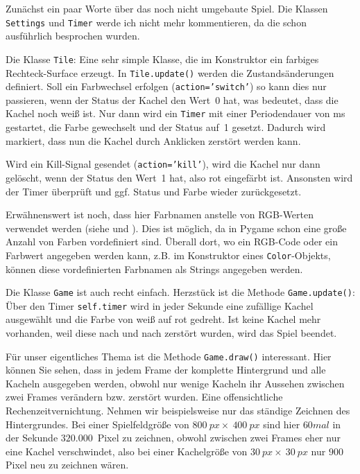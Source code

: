 Zunächst ein paar Worte über das noch nicht umgebaute Spiel. Die Klassen \texttt{Settings} und \texttt{Timer} werde ich nicht mehr kommentieren, da die schon ausführlich besprochen wurden. 

Die Klasse \texttt{Tile}: Eine sehr simple Klasse, die im Konstruktor ein farbiges Rechteck-Surface erzeugt. In \texttt{Tile.update()} werden die Zustandsänderungen definiert. Soll ein Farbwechsel erfolgen (\texttt{action='switch'}) so kann dies nur passieren, wenn der Status der Kachel den Wert~0 hat, was bedeutet, dass die Kachel noch weiß ist. Nur dann wird ein \texttt{Timer} mit einer Periodendauer von \unit[500]{ms} gestartet, die Farbe gewechselt und der Status auf~1 gesetzt. Dadurch wird markiert, dass nun die Kachel durch Anklicken zerstört werden kann.

Wird ein Kill-Signal gesendet (\texttt{action='kill'}), wird die Kachel nur dann gelöscht, wenn der Status den Wert~1 hat, also rot eingefärbt ist. Ansonsten wird der Timer überprüft und ggf. Status und Farbe wieder zurückgesetzt.

Erwähnenswert ist noch, dass hier Farbnamen anstelle von RGB-Werten verwendet werden (siehe  und ). Dies ist möglich, da in Pygame schon eine große Anzahl von Farben vordefiniert sind. Überall dort, wo ein RGB-Code oder ein Farbwert angegeben werden kann, z.B. im Konstruktor eines \texttt{Color}-Objekts, können diese vordefinierten Farbnamen als Strings angegeben werden.


Die Klasse \texttt{Game} ist auch recht einfach. Herzstück ist die Methode \texttt{Game.update()}: Über den Timer \texttt{self.timer} wird in jeder Sekunde eine zufällige Kachel ausgewählt und die Farbe von weiß auf rot gedreht. Ist keine Kachel mehr vorhanden, weil diese nach und nach zerstört wurden, wird das Spiel beendet.

Für unser eigentliches Thema ist die Methode \texttt{Game.draw()} interessant. Hier können Sie sehen, dass in jedem Frame der komplette Hintergrund und alle Kacheln ausgegeben werden, obwohl nur wenige Kacheln ihr Aussehen zwischen zwei Frames verändern bzw. zerstört wurden. Eine offensichtliche Rechenzeitvernichtung. Nehmen wir beispielsweise nur das ständige Zeichnen des Hintergrundes. Bei einer Spielfeldgröße von $800~px\times~400~px$ sind hier $60mal$ in der Sekunde $320.000$~Pixel zu zeichnen, obwohl zwischen zwei Frames eher nur eine Kachel verschwindet, also bei einer Kachelgröße von $30~px\times~30~px$ nur $900$ Pixel neu zu zeichnen wären.

